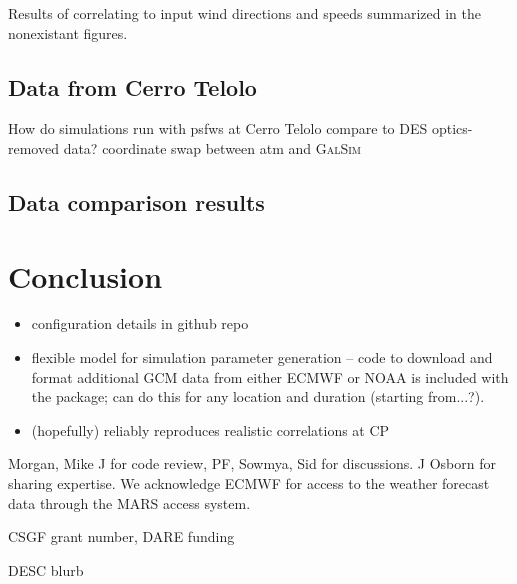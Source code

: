 \documentclass[twocolumn]{aastex631}
\newcommand{\galsim}{\textsc{GalSim}\xspace}
\begin{document}
Results of correlating to input wind directions and speeds summarized in the nonexistant figures. 

\subsection{Data from Cerro Telolo} \label{sec:descompare}
How do simulations run with psfws at Cerro Telolo compare to DES optics-removed data?
coordinate swap between atm and \galsim

\subsection{Data comparison results} \label{sec:desresults}

\section{Conclusion}

\begin{itemize}
    \item configuration details in github repo
    \item flexible model for simulation parameter generation -- code to download and format additional GCM data from either ECMWF or NOAA is included with the package; can do this for any location and duration (starting from...?). 
    \item (hopefully) reliably reproduces realistic correlations at CP
\end{itemize}

\begin{acknowledgments}
Morgan, Mike J for code review, PF, Sowmya, Sid for discussions. J Osborn for sharing expertise. We acknowledge ECMWF for access to the weather forecast data through the MARS access system.

CSGF grant number, DARE funding

DESC blurb
\end{acknowledgments}

\vspace{5mm}


\end{document}
